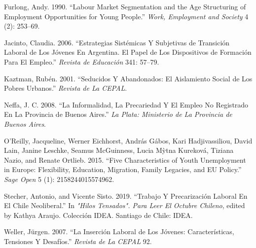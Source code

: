 \documentclass[]{article}
\begin{document}
\leavevmode\hypertarget{ref-furlong_labour_1990}{}%
Furlong, Andy. 1990. ``Labour Market Segmentation and the Age
Structuring of Employment Opportunities for Young People.'' \emph{Work,
Employment and Society} 4 (2): 253--69.

\leavevmode\hypertarget{ref-jacinto_estrategias_2006}{}%
Jacinto, Claudia. 2006. ``Estrategias Sistémicas Y Subjetivas de
Transición Laboral de Los Jóvenes En Argentina. El Papel de Los
Dispositivos de Formación Para El Empleo.'' \emph{Revista de Educación}
341: 57--79.

\leavevmode\hypertarget{ref-kaztman_seducidos_2001}{}%
Kaztman, Rubén. 2001. ``Seducidos Y Abandonados: El Aislamiento Social
de Los Pobres Urbanos.'' \emph{Revista de La CEPAL}.

\leavevmode\hypertarget{ref-neffa_informalidad_2008}{}%
Neffa, J. C. 2008. ``La Informalidad, La Precariedad Y El Empleo No
Registrado En La Provincia de Buenos Aires.'' \emph{La Plata: Ministerio
de La Provincia de Buenos Aires}.

\leavevmode\hypertarget{ref-oreilly_five_2015}{}%
O'Reilly, Jacqueline, Werner Eichhorst, András Gábos, Kari
Hadjivassiliou, David Lain, Janine Leschke, Seamus McGuinness, Lucia
Mỳtna Kureková, Tiziana Nazio, and Renate Ortlieb. 2015. ``Five
Characteristics of Youth Unemployment in Europe: Flexibility, Education,
Migration, Family Legacies, and EU Policy.'' \emph{Sage Open} 5 (1):
2158244015574962.

\leavevmode\hypertarget{ref-stecher_trabajo_2019}{}%
Stecher, Antonio, and Vicente Sisto. 2019. ``Trabajo Y Precarización
Laboral En El Chile Neoliberal.'' In \emph{"Hilos Tensados". Para Leer
El Octubre Chileno}, edited by Kathya Araujo. Colección IDEA. Santiago
de Chile: IDEA.

\leavevmode\hypertarget{ref-weller_insercion_2007}{}%
Weller, Jürgen. 2007. ``La Inserción Laboral de Los Jóvenes:
Características, Tensiones Y Desafíos.'' \emph{Revista de La CEPAL} 92.
\end{document}
